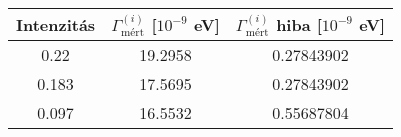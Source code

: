 \begin{center}
\begin{tabular}{|c|c|c|}
\hline
Intenzitás & $\Gamma_{\text{mért}}^{(i)}$ [$10^{-9}$ eV] & $\Gamma_{\text{mért}}^{(i)}$ hiba [$10^{-9}$ eV] \\
\hline
0.22 & 19.2958 & 0.27843902 \\
\hline
0.183 & 17.5695 & 0.27843902 \\
\hline
0.097 & 16.5532 & 0.55687804\\
\hline
\end{tabular}
\end{center}
